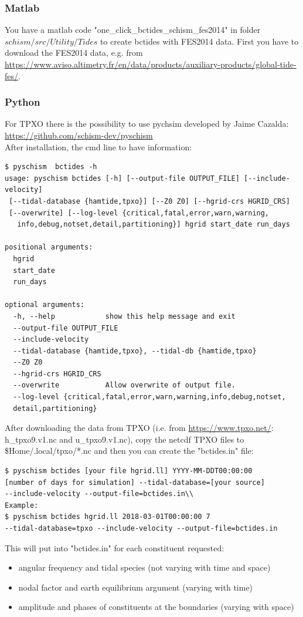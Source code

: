 \documentclass[preprints,briefreport,accept,oneauthor,pdftex]{Definitions/mdpi}
\begin{document}
\subsubsection{Matlab}
\noindent You have a matlab code "one\_click\_bctides\_schism\_fes2014" in folder $schism/src/Utility/Tides$ to create bctides with FES2014 data. First you have to download the FES2014 data, e.g. from \url{https://www.aviso.altimetry.fr/en/data/products/auxiliary-products/global-tide-fes/}.
\subsubsection{Python}
\noindent For TPXO there is the possibility to use pychsim developed by Jaime Cazalda:\\ \url{https://github.com/schism-dev/pyschism}\\
After installation, the cmd line to have information:
\begin{lstlisting}
$ pyschism  bctides -h
usage: pyschism bctides [-h] [--output-file OUTPUT_FILE] [--include-velocity]
 [--tidal-database {hamtide,tpxo}] [--Z0 Z0] [--hgrid-crs HGRID_CRS] 
 [--overwrite] [--log-level {critical,fatal,error,warn,warning,
   info,debug,notset,detail,partitioning}] hgrid start_date run_days

positional arguments:
  hgrid
  start_date
  run_days

optional arguments:
  -h, --help            show this help message and exit
  --output-file OUTPUT_FILE
  --include-velocity
  --tidal-database {hamtide,tpxo}, --tidal-db {hamtide,tpxo}
  --Z0 Z0
  --hgrid-crs HGRID_CRS
  --overwrite           Allow overwrite of output file.
  --log-level {critical,fatal,error,warn,warning,info,debug,notset,
  detail,partitioning}
  \end{lstlisting}
After downloading the data from TPXO (i.e. from \url{https://www.tpxo.net/}: h\_tpxo9.v1.nc and u\_tpxo9.v1.nc), copy the netcdf TPXO files to \$Home/.local/tpxo/*.nc and then you can create the "bctides.in" file:
\begin{lstlisting}
$ pyschism bctides [your file hgrid.ll] YYYY-MM-DDT00:00:00 
[number of days for simulation] --tidal-database=[your source] 
--include-velocity --output-file=bctides.in\\
Example:
$ pyschism bctides hgrid.ll 2018-03-01T00:00:00 7 
--tidal-database=tpxo --include-velocity --output-file=bctides.in
\end{lstlisting}
This will put into "bctides.in" for each constituent requested:
\begin{itemize}
    \item angular frequency and tidal species (not varying with time and space)
    \item nodal factor and earth equilibrium argument (varying with time)
    \item amplitude and phases of constituents at the boundaries (varying with space)
\end{itemize}
\end{document}
